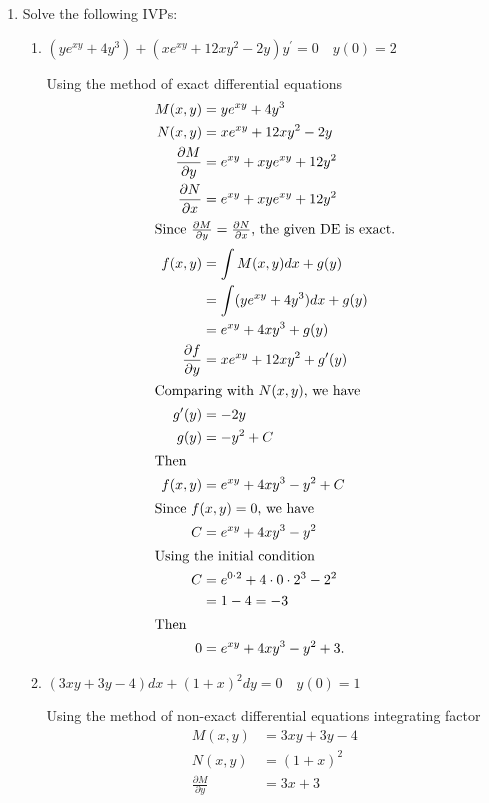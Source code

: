 \documentclass{zc-ust-hw}
\begin{document}
\begin{enumerate}
  \item Solve the following IVPs:
    \begin{enumerate}
      \item $\left(y e^{x y}+4 y^3\right)+\left(x e^{x y}+12 x y^2-2 y\right) y^{\prime}=0 \quad y(0)=2$
        \begin{sol} Using the method of exact differential equations
          \begin{align}
            M(x,y)&=y e^{x y}+4 y^3\\
            N(x,y)&=x e^{x y}+12 x y^2-2 y\\
            \frac{\partial M}{\partial y}&=e^{x y}+x y e^{x y}+12 y^2\\
            \frac{\partial N}{\partial x}&=e^{x y}+x y e^{x y}+12 y^2\\
            \intertext{Since $\frac{\partial M}{\partial y}=\frac{\partial
            N}{\partial x}$, the given DE is exact.}
            f(x,y)&=\int M(x,y) dx + g(y)\\
                  &=\int (y e^{x y}+4 y^3) dx + g(y)\\
                  &=e^{xy}+4xy^3+g(y)\\
            \frac{\partial f}{\partial y}&=xe^{xy}+12xy^2+g'(y)\\
            \intertext{Comparing with $N(x,y)$, we have}
            g'(y)&=-2y\\
            g(y)&=-y^2+C\\
            \intertext{Then}
            f(x,y)&=e^{xy}+4xy^3-y^2+C\\
            \intertext{Since $f(x,y)=0$, we have}
            C&=e^{xy}+4xy^3-y^2\\
            \intertext{Using the initial condition}
            C&=e^{0\cdot2}+4\cdot0\cdot2^3-2^2\\
             &=1-4=-3\\
            \intertext{Then}
            0&=e^{xy}+4xy^3-y^2+3
          .\end{align}
        \end{sol}
      \item $(3 x y+3 y-4) d x+(1+x)^2 d y=0 \quad y(0)=1$
        \begin{sol} Using the method of non-exact differential equations
          integrating factor
          \begin{align}
            M(x,y)&=3xy+3y-4\\
            N(x,y)&=(1+x)^2\\
            \frac{\partial M}{\partial y}&=3x+3\\

\end{align}
\end{sol}
\end{enumerate}
\end{enumerate}
\end{document}
